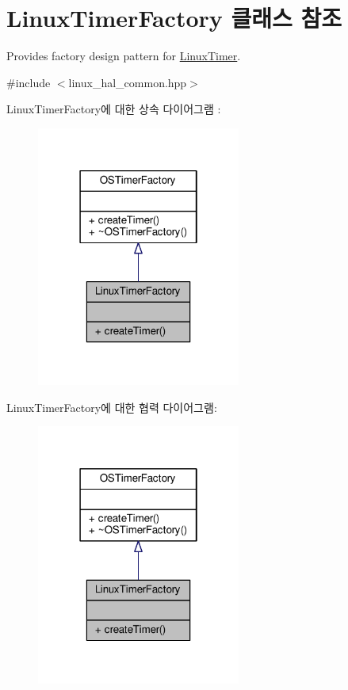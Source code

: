 \hypertarget{class_linux_timer_factory}{}\section{Linux\+Timer\+Factory 클래스 참조}
\label{class_linux_timer_factory}


Provides factory design pattern for \hyperlink{class_linux_timer}{Linux\+Timer}.  




{\ttfamily \#include $<$linux\+\_\+hal\+\_\+common.\+hpp$>$}



Linux\+Timer\+Factory에 대한 상속 다이어그램 \+: 
\nopagebreak
\begin{figure}[H]
\begin{center}
\leavevmode
\includegraphics[width=190pt]{class_linux_timer_factory__inherit__graph}
\end{center}
\end{figure}


Linux\+Timer\+Factory에 대한 협력 다이어그램\+:
\nopagebreak
\begin{figure}[H]
\begin{center}
\leavevmode
\includegraphics[width=190pt]{class_linux_timer_factory__coll__graph}
\end{center}
\end{figure}
